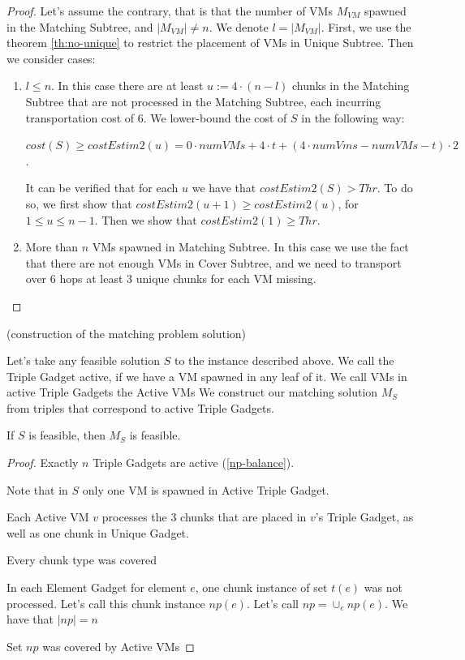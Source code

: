 \begin{proof}
  Let's assume the contrary, that is that the number of VMs $M_{VM}$
  spawned in the Matching Subtree, and $|M_{VM}| \neq n$. We denote
  $l=|M_{VM}|$. First, we use the theorem \ref{th:no-unique} to
  restrict the placement of VMs in Unique Subtree. Then we consider
  cases:
  \begin{enumerate}
  \item $l \leq n$. In this case there are at least
    $u := 4 \cdot (n-l)$ chunks in the Matching Subtree that are not
    processed in the Matching Subtree, each incurring transportation
    cost of $6$. We lower-bound the cost of $S$ in the following way:

    $cost(S) \geq costEstim2(u) = 0\cdot numVMs + 4\cdot t + (4\cdot
    numVms - numVMs - t)\cdot 2$.

    It can be verified that for each $u$ we have that
    $costEstim2(S) > Thr$. To do so, we first show that
    $costEstim2(u+1) \geq costEstim2(u)$, for $1\leq u \leq n-1$. Then
    we show that $costEstim2(1) \geq Thr$.

  \item More than $n$ VMs spawned in Matching Subtree. In this case we
    use the fact that there are not enough VMs in Cover Subtree, and
    we need to transport over $6$ hops at least 3 unique chunks for
    each VM missing.

  \end{enumerate}
\end{proof}

(construction of the matching problem solution)

Let's take any feasible solution $S$ to the instance described
above. We call the Triple Gadget active, if we have a VM spawned in
any leaf of it. We call VMs in active Triple Gadgets the Active VMs We
construct our matching solution $M_S$ from triples that correspond to
active Triple Gadgets.

\begin{lemma}
  If $S$ is feasible, then $M_S$ is feasible.
\end{lemma}

\begin{proof}
\item Exactly $n$ Triple Gadgets are active (\ref{np-balance}).
\item Note that in $S$ only one VM is spawned in Active Triple Gadget.
\item Each Active VM $v$ processes the 3 chunks that are placed in
  $v$'s Triple Gadget, as well as one chunk in Unique Gadget.
\item Every chunk type was covered
\item In each Element Gadget for element $e$, one chunk instance of
  set $t(e)$ was not processed. Let's call this chunk instance
  $np(e)$. Let's call $np = \cup_e np(e)$. We have that $|np| = n$
\item Set $np$ was covered by Active VMs
\item
\end{proof}

